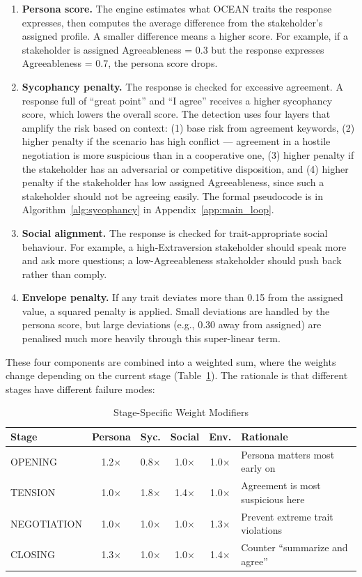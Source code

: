 \documentclass[12pt, a4paper]{report}
\begin{document}
\begin{enumerate}[leftmargin=*, itemsep=2pt]
    \item \textbf{Persona score.} The engine estimates what OCEAN traits the response expresses, then computes the average difference from the stakeholder's assigned profile. A smaller difference means a higher score. For example, if a stakeholder is assigned Agreeableness = 0.3 but the response expresses Agreeableness = 0.7, the persona score drops.
    \item \textbf{Sycophancy penalty.} The response is checked for excessive agreement. A response full of ``great point'' and ``I agree'' receives a higher sycophancy score, which lowers the overall score. The detection uses four layers that amplify the risk based on context: (1) base risk from agreement keywords, (2) higher penalty if the scenario has high conflict --- agreement in a hostile negotiation is more suspicious than in a cooperative one, (3) higher penalty if the stakeholder has an adversarial or competitive disposition, and (4) higher penalty if the stakeholder has low assigned Agreeableness, since such a stakeholder should not be agreeing easily. The formal pseudocode is in Algorithm~\ref{alg:sycophancy} in Appendix~\ref{app:main_loop}.
    \item \textbf{Social alignment.} The response is checked for trait-appropriate social behaviour. For example, a high-Extraversion stakeholder should speak more and ask more questions; a low-Agreeableness stakeholder should push back rather than comply.
    \item \textbf{Envelope penalty.} If any trait deviates more than 0.15 from the assigned value, a squared penalty is applied. Small deviations are handled by the persona score, but large deviations (e.g., 0.30 away from assigned) are penalised much more heavily through this super-linear term.
\end{enumerate}

These four components are combined into a weighted sum, where the weights change depending on the current stage (Table~\ref{tab:phase_weights}). The rationale is that different stages have different failure modes:

\begin{table}[t]
\centering
\caption{Stage-Specific Weight Modifiers}
\label{tab:phase_weights}
\footnotesize
\begin{tabular}{lccccp{4cm}}
\toprule
Stage & Persona & Syc. & Social & Env. & Rationale \\
\midrule
OPENING & 1.2$\times$ & 0.8$\times$ & 1.0$\times$ & 1.0$\times$ & Persona matters most early on \\
TENSION & 1.0$\times$ & 1.8$\times$ & 1.4$\times$ & 1.0$\times$ & Agreement is most suspicious here \\
NEGOTIATION & 1.0$\times$ & 1.0$\times$ & 1.0$\times$ & 1.3$\times$ & Prevent extreme trait violations \\
CLOSING & 1.3$\times$ & 1.0$\times$ & 1.0$\times$ & 1.4$\times$ & Counter ``summarize and agree'' \\
\bottomrule
\end{tabular}
\end{table}
\end{document}
